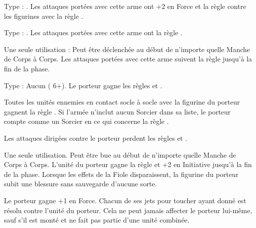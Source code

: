 \startpricelist

Type : \hw{}. Les attaques portées avec cette arme ont +2 en Force et la règle  contre les figurines avec la règle \flammable{}.

Type : \hw{}. Les attaques portées avec cette arme ont la règle .

Une seule utilisation : Peut être déclenchée au début de n'importe quelle Manche de Corps à Corps. Les attaques portées avec cette arme suivent la règle \metalshifting{} jusqu'à la fin de la phase.

\endpricelist

\armymagicalarmour

\startpricelist

Type : Aucun (\armoursave{} 6+). Le porteur gagne les règles  et \fireborn{}.

\endpricelist

\armytalismans

\startpricelist

Toutes les unités ennemies en contact socle à socle avec la figurine du porteur gagnent la règle \flammable{}. Si l'armée n'inclut aucun Sorcier dans sa liste, le porteur compte comme un Sorcier en ce qui concerne la règle \shacklesoffire{}.

Les attaques dirigées contre le porteur perdent les règles \poisonedattacks{} et .

\endpricelist

\armyenchanteditems

\startpricelist

Une seule utilisation. Peut être bue au début de n'importe quelle Manche de Corps à Corps. L'unité du porteur gagne la règle \lightningreflexes{} et +2 en Initiative jusqu'à la fin de la phase. Lorsque les effets de la Fiole disparaissent, la figurine du porteur subit une blessure sans sauvegarde d'aucune sorte.

Le porteur gagne +1 en Force. Chacun de ses jets pour toucher ayant donné  est résolu contre l'unité du porteur. Cela ne peut jamais affecter le porteur lui-même, sauf s'il est monté et ne fait pas partie d'une unité combinée.

\endpricelist

